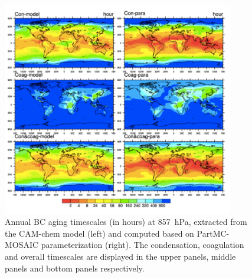 \documentclass[12pt, fullpage]{uiucthesis2009}
\begin{document}
	\begin{figure}[h] 
		\begin{center}
			\includegraphics[width = 0.9\textwidth]{Figure33}
			\caption[Annual BC aging timescales (in hours) at 857~hPa, extracted from the CAM-chem model (left) and computed based on PartMC-MOSAIC parameterization (right). The condensation, coagulation and overall timescales are displayed in the upper panels, middle panels and bottom panels respectively]{\label{fig_p33} Annual BC aging timescales (in hours) at 857~hPa, extracted from the CAM-chem model (left) and computed based on PartMC-MOSAIC parameterization (right). The condensation, coagulation and overall timescales are displayed in the upper panels, middle panels and bottom panels respectively. }
		\end{center}
	\end{figure}
	
\end{document}
